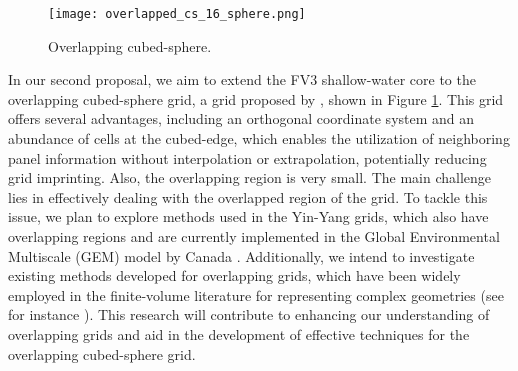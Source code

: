\begin{figure}[!htb]
	\centering
	\texttt{[image: overlapped\_cs\_16\_sphere.png]}
	\caption{Overlapping cubed-sphere.\label{gridoverlaped}}
\end{figure}

In our second proposal, we aim to extend the FV3 shallow-water core to the overlapping cubed-sphere grid, a grid proposed by \citet{purser:2017}, shown in Figure \ref{gridoverlaped}.
This grid offers several advantages, including an orthogonal coordinate system and an abundance of cells at the cubed-edge,
which enables the utilization of neighboring panel information without interpolation or extrapolation, potentially reducing grid imprinting.
Also, the overlapping region is very small.
The main challenge lies in effectively dealing with the overlapped region of the grid. To tackle this issue, we plan to explore methods used in the Yin-Yang grids, which also have overlapping regions and are currently implemented in the Global Environmental Multiscale (GEM) model by Canada \citep{qaddouri:2011,husain:2019}.
Additionally, we intend to investigate existing methods developed for overlapping grids, which have been widely employed in the finite-volume literature for representing complex geometries
(see for instance \citep{hadzic:2005}).
This research will contribute to enhancing our understanding of overlapping grids and aid in the development of effective techniques for the overlapping cubed-sphere grid.

